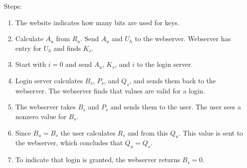 \par
Steps:
\begin{enumerate}
\item	The website indicates how many bits are used for keys.
\item	Calculate $A_u$ from $R_u$.
		Send $A_u$ and $U_h$ to the webserver.
		Webserver has entry for $U_h$ and finds $K_s$.
\item	Start with $i=0$ and send $A_u$, $K_s$, and $i$ to the login server.
\item	Login server calculates $B_s$, $P_s$, and $Q_s$,
		and sends them back to the webserver.
		The webserver finds that values are valid for a login.
\item	The webserver takes $B_s$ and $P_s$ and sends them to the user.
		The user sees a nonzero value for $B_s$.
\item	Since $B_u=B_s$ the user calculates $R_s$ and from this $Q_u$.
		This value is sent to the webserver, which concludes that $Q_u=Q_s$.
\item	To indicate that login is granted, the webserver returns $B_s=0$.
\end{enumerate}
